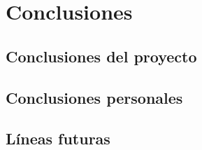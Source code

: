 \chapter{Conclusiones}
\label{ch:conclusiones}
\section{Conclusiones del proyecto}\label{sec:conclusiones-del-proyecto}

\section{Conclusiones personales}\label{sec:conclusiones-personales}

\section{Líneas futuras}\label{sec:líneas-futuras}